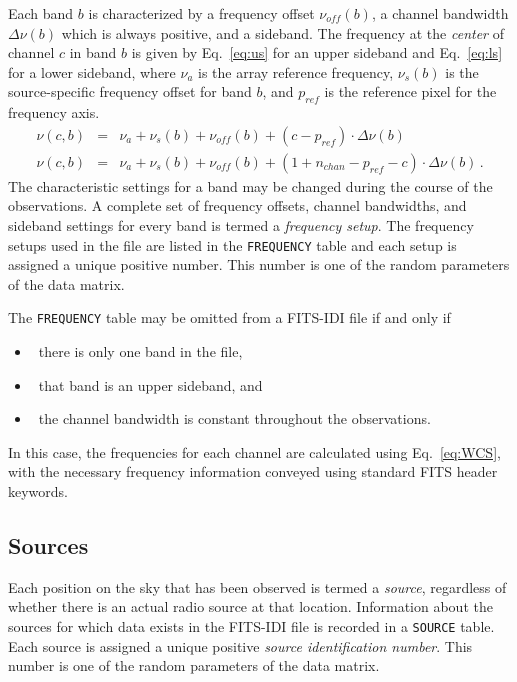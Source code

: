 \documentclass[twoside]{article}
\newcommand{\Hi}[1]{\textcolor{hicol}{#1}}
\begin{document}
\Hi{Each band $b$ is characterized by a frequency offset
$\nu_{off}(b)$, a channel bandwidth $\Delta \nu(b)$ which is always
positive,} and a sideband.  The frequency at the {\it center} of
channel $c$ in band $b$ is given by Eq.~\ref{eq:us} for an upper
sideband and Eq.~\ref{eq:ls} for a lower sideband, where $\nu_a$ is
the array reference frequency, $\nu_s(b)$ is the source-specific
frequency offset for band $b$, and $p_{ref}$ is the reference pixel
for the frequency axis.
\begin{eqnarray}
\nu(c,b) & = & \nu_a + \nu_s(b) + \nu_{off}(b) + (c - p_{ref}) \cdot
                  \Delta \nu(b)  \label{eq:us} \\
\nu(c,b) & = & \nu_a + \nu_s(b) + \nu_{off}(b) + (1+ n_{chan} -
                   p_{ref} -c) \cdot \Delta \nu (b)  \label{eq:ls} \, .
\end{eqnarray}
The characteristic settings for a band may be changed during the
course of the observations.  A complete set of frequency offsets,
channel bandwidths, and sideband settings for every \Hi{band} is
termed a {\it frequency setup}.  The frequency setups used in the file
are listed in the {\tt FREQUENCY} table and each setup is assigned a
unique \Hi{positive} number.  This number is one of the random
parameters of the data matrix.

\Hi{The {\tt FREQUENCY} table} may be omitted from a FITS-IDI file if
and only if
\begin{itemize}
\item{\ there is only one band in the file,}
\item{\ that band is an upper sideband, and}
\item{\ the channel bandwidth is constant throughout the
  observations.}
\end{itemize}
In this case, the frequencies for each channel are calculated using
Eq.~\ref{eq:WCS}\Hi{, with the necessary frequency information
  conveyed using standard FITS header keywords.}

\subsection{Sources}

Each position on the sky that has been observed is termed a {\it
  source}, regardless of whether there is an actual radio source at
that location.  Information about the sources for which data exists in
the FITS-IDI file is recorded in a {\tt SOURCE} table.  Each source is
assigned a unique \Hi{positive} {\it source identification number}.
This number is one of the random parameters of the data matrix.
\end{document}

